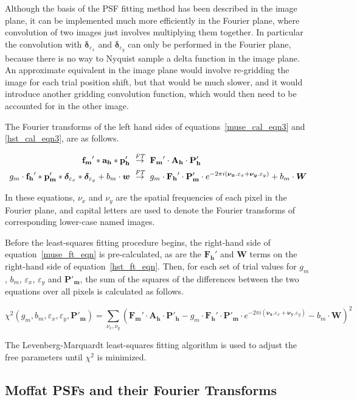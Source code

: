 \documentclass[12pt,twoside,a4paper]{article}
\newcommand{\ftarrow}{\stackrel{\mbox{\scriptsize\it FT}}{\rightarrow}}
\newcommand{\mepsf}{\mathbf{p'_m}}
\newcommand{\hepsf}{\mathbf{p'_h}}
\newcommand{\Mepsf}{\mathbf{P'_m}}
\newcommand{\Hepsf}{\mathbf{P'_h}}
\newcommand{\hlpf}{\mathbf{a_h}}
\newcommand{\Hlpf}{\mathbf{A_h}}
\newcommand{\mimg}{\mathbf{f_m}}
\newcommand{\himg}{\mathbf{f_h}}
\newcommand{\Mimg}{\mathbf{F_m}}
\newcommand{\Himg}{\mathbf{F_h}}
\newcommand{\mdx}{\bm{\delta}_{\dx}}
\newcommand{\mdy}{\bm{\delta}_{\dy}}
\newcommand{\Mdxy}{e^{-2\pi i(\bm{\nu_x}.\varepsilon_x + \bm{\nu_y}.\varepsilon_y)}}
\newcommand{\dx}{\varepsilon_x}
\newcommand{\dy}{\varepsilon_y}
\newcommand{\wt}{\bm{w}}
\newcommand{\Wt}{\bm{W}}
\newcommand{\mgain}{g_m}
\newcommand{\mbg}{b_m}
\begin{document}
Although the basis of the PSF fitting method has been described in the
image plane, it can be implemented much more efficiently in the
Fourier plane, where convolution of two images just involves
multiplying them together. In particular the convolution with $\mdx$
and $\mdy$ can only be performed in the Fourier plane, because there
is no way to Nyquist sample a delta function in the image plane. An
approximate equivalent in the image plane would involve re-gridding
the image for each trial position shift, but that would be much
slower, and it would introduce another gridding convolution function,
which would then need to be accounted for in the other image.

The Fourier transforms of the left hand sides of
equations~\ref{muse_cal_eqn3} and \ref{hst_cal_eqn3}, are as
follows.

\begin{align}
\label{muse_ft_eqn}
\mimg' \ast \hlpf \ast \hepsf \ &\ftarrow\  \Mimg' \cdot \Hlpf \cdot
\Hepsf\\
\label{hst_ft_eqn}
\mgain \cdot \himg' \ast \mepsf \ast \mdx \ast \mdy + \mbg\cdot\wt
\ &\ftarrow\  \mgain\cdot \Himg' \cdot \Mepsf \cdot \Mdxy + \mbg\cdot\Wt
\end{align}

In these equations, $\nu_x$ and $\nu_y$ are the spatial frequencies of
each pixel in the Fourier plane, and capital letters are used to
denote the Fourier transforms of corresponding lower-case named
images.

Before the least-squares fitting procedure begins, the right-hand side
of equation~\ref{muse_ft_eqn} is pre-calculated, as are the $\Himg'$
and $\Wt$ terms on the right-hand side of
equation~\ref{hst_ft_eqn}. Then, for each set of trial values for
$\mgain$, $\mbg$, $\dx$, $\dy$ and $\Mepsf$, the sum of the squares of
the differences between the two equations over all pixels is
calculated as follows.

\begin{equation}
\chi^2(\mgain,\mbg,\dx,\dy,\Mepsf) = \sum_{\nu_x,\nu_y}\left(\Mimg' \cdot \Hlpf \cdot \Hepsf - \mgain\cdot \Himg' \cdot \Mepsf \cdot \Mdxy - \mbg\cdot\Wt\right)^2
\end{equation}

The Levenberg-Marquardt least-squares fitting algorithm is used to
adjust the free parameters until $\chi^2$ is minimized.

\subsection{Moffat PSFs and their Fourier Transforms}
\end{document}
